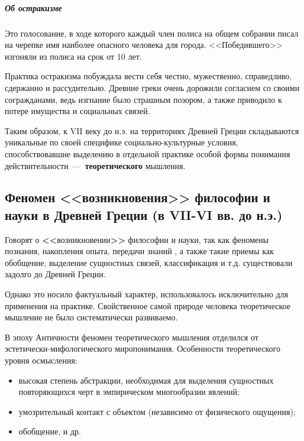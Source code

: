 \subparagraph{Об остракизме} Это голосование, в ходе которого каждый член полиса на общем собрании писал на черепке имя наиболее опасного человека для города. <<Победившего>> изгоняли из полиса на срок от 10 лет. 

Практика остракизма побуждала вести себя честно, мужественно, справедливо, сдержанно и рассудительно. Древние греки очень дорожили согласием со своими согражданами, ведь изгнание было страшным позором, а также приводило к потере имущества и социальных связей.


Таким образом, к VII веку до н.э. на территориях Древней Греции складываются уникальные по своей специфике социально-культурные условия, способствовавшие выделению в отдельной практике особой формы понимания действительности~---~\textbf{теоретического} мышления. 

\subsection{Феномен <<возникновения>> философии и науки в Древней Греции (в VII-VI вв. до н.э.)}

Говорят о \textbf{\Large<<}возникновении\textbf{\Large>>} философии и науки, так как феномены познания, накопления опыта, передачи знаний , а также такие приемы как обобщение, выделение сущностных связей, классификация и т.д. существовали задолго до Древней Греции. 

Однако это носило фактуальный характер, использовалось исключительно для применения на практике. Свойственное самой природе человека теоретическое мышление не было
систематически развиваемо.

В эпоху Античности феномен теоретического мышления отделился от эстетически-мифологического миропонимания. Особенности теоретического уровня осмысления: 
\begin{itemize}
    \item высокая степень абстракции, необходимая для выделения сущностных повторяющихся черт в эмпирическом многообразии явлений;
    \item умозрительный контакт с объектом (независимо от физического ощущения);
    \item обобщение, и др.
\end{itemize}

